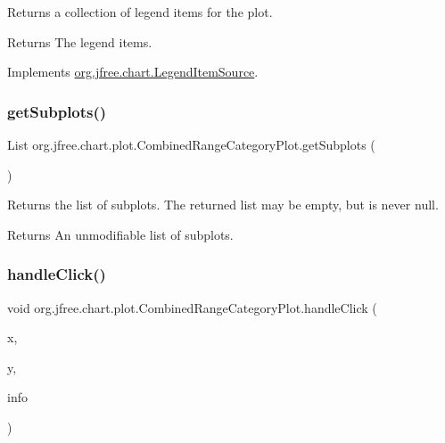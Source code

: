 Returns a collection of legend items for the plot.

\begin{DoxyReturn}{Returns}
The legend items. 
\end{DoxyReturn}


Implements \mbox{\hyperlink{interfaceorg_1_1jfree_1_1chart_1_1_legend_item_source_a224409463c4f7a8ef0e2a9df337e6d3b}{org.\+jfree.\+chart.\+Legend\+Item\+Source}}.

\mbox{\label{classorg_1_1jfree_1_1chart_1_1plot_1_1_combined_range_category_plot_a00428ece2e080b390076ce205610887d}} 
\subsubsection{\texorpdfstring{get\+Subplots()}{getSubplots()}}
{\footnotesize\ttfamily List org.\+jfree.\+chart.\+plot.\+Combined\+Range\+Category\+Plot.\+get\+Subplots (\begin{DoxyParamCaption}{ }\end{DoxyParamCaption})}

Returns the list of subplots. The returned list may be empty, but is never {\ttfamily null}.

\begin{DoxyReturn}{Returns}
An unmodifiable list of subplots. 
\end{DoxyReturn}
\mbox{\label{classorg_1_1jfree_1_1chart_1_1plot_1_1_combined_range_category_plot_a9560e9023513bb1e0ab9d6f302266ada}} 
\subsubsection{\texorpdfstring{handle\+Click()}{handleClick()}}
{\footnotesize\ttfamily void org.\+jfree.\+chart.\+plot.\+Combined\+Range\+Category\+Plot.\+handle\+Click (\begin{DoxyParamCaption}\item[{int}]{x,  }\item[{int}]{y,  }\item[{\mbox{\hyperlink{classorg_1_1jfree_1_1chart_1_1plot_1_1_plot_rendering_info}{Plot\+Rendering\+Info}}}]{info }\end{DoxyParamCaption})}

